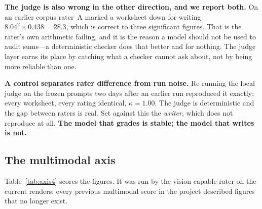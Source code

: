 \documentclass[conference]{IEEEtran}
\begin{document}
\textbf{The judge is also wrong in the other direction, and we report both.} On
an earlier corpus rater~A marked a worksheet down for writing
$8.04^{2} \times 0.438 = 28.3$, which is correct to three significant figures.
That is the rater's own arithmetic failing, and it is the reason a model should
not be used to audit sums---a deterministic checker does that better and for
nothing. The judge layer earns its place by catching what a checker cannot ask
about, not by being more reliable than one.

\textbf{A control separates rater difference from run noise.} Re-running the
local judge on the frozen prompts two days after an earlier run reproduced it
exactly: every worksheet, every rating identical, $\kappa = 1.00$. The
judge is deterministic and the gap between raters is real. Set against this the
\emph{writer}, which does not reproduce at all. \textbf{The model that grades is
stable; the model that writes is not.}

\subsection{The multimodal axis}

Table~\ref{tab:axis4} scores the figures. It was run by the vision-capable
rater on the current renders; every previous multimodal score in the project
described figures that no longer exist.
\end{document}
